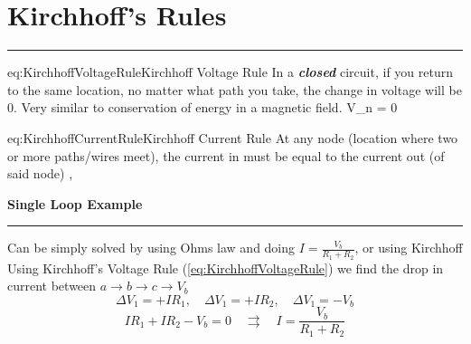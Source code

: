 \pagebreak
\section{Kirchhoff's Rules}
\hrule
\vspace{.5cm}

\begin{eqboxed}{eq:KirchhoffVoltageRule}{Kirchhoff Voltage Rule}
{In a \textit{\textbf{closed}} circuit, if you return to the same location, no matter what path you take, the change in voltage will be 0. Very similar to conservation of energy in a magnetic field.}
\sum\Delta V_n = 0 
\end{eqboxed}

\begin{eqboxed}{eq:KirchhoffCurrentRule}{Kirchhoff Current Rule}
{At any node (location where two or more paths/wires meet), the current in must be equal to the current out (of said node)}
, 
\end{eqboxed}

\begin{example}
    \textbf{Single Loop Example\label{ex:SingleLoopExample}}
    \vspace{.2cm}
    \hrule 
    \vspace{.2cm}

    \begin{center}

        Can be simply solved by using Ohms law and doing \(I = \frac{V_b}{R_1 +R_2}\), or using Kirchhoff\\ 
        \vspace{.25cm}
        Using Kirchhoff's Voltage Rule (\ref{eq:KirchhoffVoltageRule}) we find the drop in current between \(a \rightarrow b \rightarrow c \rightarrow V_b\)
        \[\Delta V_1 = +IR_1, \quad \Delta V_1 = +IR_2, \quad \Delta V_1 = -V_b\]
        \[ IR_1 + IR_2 - V_b = 0 \quad \rightrightarrows \quad I = \frac{V_b}{R_1 +R_2 }\]
    \end{center}
\end{example}


